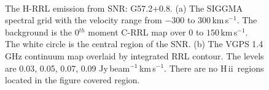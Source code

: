 \documentclass[manuscript]{aastex61}
\newcommand{\hii}{{\rm H\,}{{\sc ii}}}
\newcommand{\kms}{\,km\,s$^{-1}$}
\begin{document}
\begin{figure}[H]
\centering
{}
\\
\caption{The H-RRL emission from SNR: G57.2+0.8.
          (a) The SIGGMA spectral grid with the velocity range from $-300$ to $300$\kms.
	  The background is the 0$^{th}$ moment C-RRL map over $0$ to $150$\kms.
	  The white circle is the central region of the SNR.
	  (b) The VGPS 1.4 GHz continuum map overlaid by integrated RRL contour.
	  The levels are 0.03, 0.05, 0.07, 0.09 Jy\,beam$^{-1}$\kms.
	  There are no \hii\ regions located in the figure covered region.
	  }
\label{fig_snr-g572}

\end{figure}

\newpage



\end{document}

